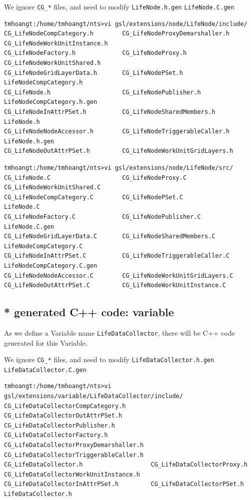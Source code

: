 We ignore \verb!CG_*! files, and need to modify 
\verb!LifeNode.h.gen! \verb!LifeNode.C.gen!

{\tiny
\begin{verbatim}
tmhoangt:/home/tmhoangt/nts>vi gsl/extensions/node/LifeNode/include/
CG_LifeNodeCompCategory.h        CG_LifeNodeProxyDemarshaller.h   CG_LifeNodeWorkUnitInstance.h
CG_LifeNodeFactory.h             CG_LifeNodeProxy.h               CG_LifeNodeWorkUnitShared.h
CG_LifeNodeGridLayerData.h       CG_LifeNodePSet.h                LifeNodeCompCategory.h
CG_LifeNode.h                    CG_LifeNodePublisher.h           LifeNodeCompCategory.h.gen
CG_LifeNodeInAttrPSet.h          CG_LifeNodeSharedMembers.h       LifeNode.h
CG_LifeNodeNodeAccessor.h        CG_LifeNodeTriggerableCaller.h   LifeNode.h.gen
CG_LifeNodeOutAttrPSet.h         CG_LifeNodeWorkUnitGridLayers.h
\end{verbatim}
}

{\tiny 
\begin{verbatim}
tmhoangt:/home/tmhoangt/nts>vi gsl/extensions/node/LifeNode/src/
CG_LifeNode.C                    CG_LifeNodeProxy.C               CG_LifeNodeWorkUnitShared.C
CG_LifeNodeCompCategory.C        CG_LifeNodePSet.C                LifeNode.C
CG_LifeNodeFactory.C             CG_LifeNodePublisher.C           LifeNode.C.gen
CG_LifeNodeGridLayerData.C       CG_LifeNodeSharedMembers.C       LifeNodeCompCategory.C
CG_LifeNodeInAttrPSet.C          CG_LifeNodeTriggerableCaller.C   LifeNodeCompCategory.C.gen
CG_LifeNodeNodeAccessor.C        CG_LifeNodeWorkUnitGridLayers.C
CG_LifeNodeOutAttrPSet.C         CG_LifeNodeWorkUnitInstance.C
\end{verbatim}
}

\subsection{* generated C++ code: variable}
\label{sec:MGS_user-defined-class-variable}

As we define a Variable name \verb!LifeDataCollector!, there will be C++ code
generated for this Variable.

We ignore \verb!CG_*! files, and need to modify 
\verb!LifeDataCollector.h.gen! \verb!LifeDataCollector.C.gen!

{\tiny 
\begin{verbatim}
tmhoangt:/home/tmhoangt/nts>vi gsl/extensions/variable/LifeDataCollector/include/
CG_LifeDataCollectorCompCategory.h       CG_LifeDataCollectorOutAttrPSet.h        CG_LifeDataCollectorPublisher.h
CG_LifeDataCollectorFactory.h            CG_LifeDataCollectorProxyDemarshaller.h  CG_LifeDataCollectorTriggerableCaller.h
CG_LifeDataCollector.h                   CG_LifeDataCollectorProxy.h              CG_LifeDataCollectorWorkUnitInstance.h
CG_LifeDataCollectorInAttrPSet.h         CG_LifeDataCollectorPSet.h               LifeDataCollector.h
\end{verbatim}
}


